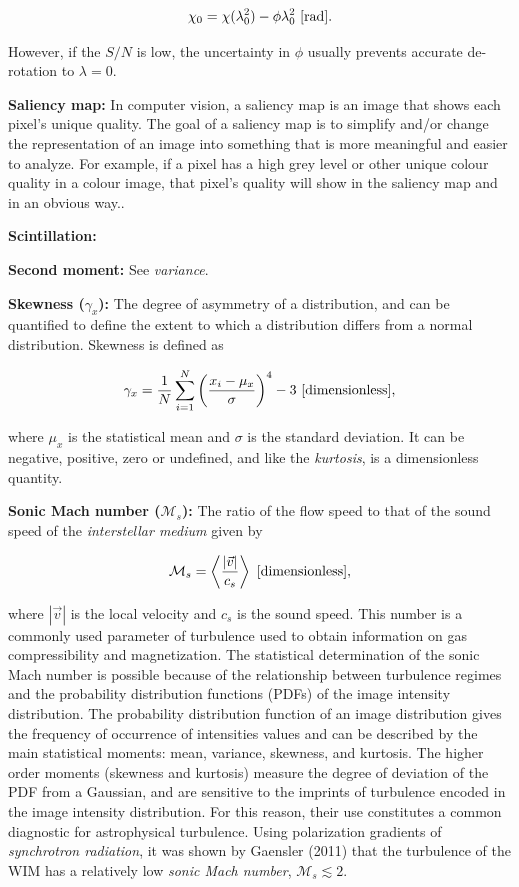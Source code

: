 \documentclass[a4paper,10pt]{article}
\begin{document}
\begin{align*}
    \chi_0 = \chi(\lambda_0^2) - \phi\lambda_0^2 ~ [{\rm rad}].
\end{align*}

{\noindent}However, if the $S/N$ is low, the uncertainty in $\phi$ usually prevents accurate de-rotation to $\lambda=0$. 

{\noindent}\textbf{Saliency map:} In computer vision, a saliency map is an image that shows each pixel's unique quality. The goal of a saliency map is to simplify and/or change the representation of an image into something that is more meaningful and easier to analyze. For example, if a pixel has a high grey level or other unique colour quality in a colour image, that pixel's quality will show in the saliency map and in an obvious way..

{\noindent}\textbf{Scintillation:}

{\noindent}\textbf{Second moment:} See \textit{variance}.

{\noindent}\textbf{Skewness ($\gamma_x$):} The degree of asymmetry of a distribution, and can be quantified to define the extent to which a distribution differs from a normal distribution. Skewness is defined as

\begin{align*}
    \gamma_x = \frac{1}{N} \sum_{i=1}^N \left(\frac{x_i-\mu_x}{\sigma}\right)^4 -3 ~ [{\rm dimensionless}],
\end{align*}

{\noindent}where $\mu_x$ is the statistical mean and $\sigma$ is the standard deviation. It can be negative, positive, zero or undefined, and like the \textit{kurtosis}, is a dimensionless quantity.

{\noindent}\textbf{Sonic Mach number ($\mathcal{M}_s$):} The ratio of the flow speed to that of the sound speed of the \textit{interstellar medium} given by

\begin{align*}
    \mathcal{M}_s = \left\langle\frac{\lvert\vec{v}\rvert}{c_s}\right\rangle ~ [{\rm dimensionless}],
\end{align*}

{\noindent}where $|\vec{v}|$ is the local velocity and $c_s$ is the sound speed. This number is a commonly used parameter of turbulence used to obtain information on gas compressibility and magnetization. The statistical determination of the sonic Mach number is possible because of the relationship between turbulence regimes and the probability distribution functions (PDFs) of the image intensity distribution. The probability distribution function of an image distribution gives the frequency of occurrence of intensities values and can be described by the main statistical moments: mean, variance, skewness, and kurtosis. The higher order moments (skewness and kurtosis) measure the degree of deviation of the PDF from a Gaussian, and are sensitive to the imprints of turbulence encoded in the image intensity distribution. For this reason, their use constitutes a common diagnostic for astrophysical turbulence. Using polarization gradients of \textit{synchrotron radiation}, it was shown by Gaensler (2011) that the turbulence of the WIM has a relatively low \textit{sonic Mach number}, $\mathcal{M}_s\lesssim2$.
\end{document}
